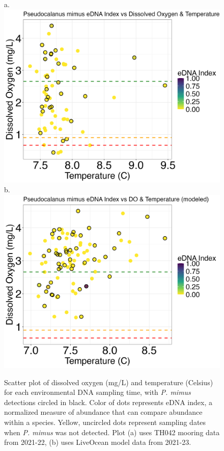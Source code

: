 \documentclass[12pt,twoside]{reedthesis}
\begin{document}
	\begin{figure}[!h]
		\begin{center}
			a. \includegraphics[scale=0.3]{Pmimus_Scatter_noOut}
			b. \includegraphics[scale=0.3]{Pmimus_Scatter_AllYr_mod_noOut}
			\caption[\textit{P. mimus} scatterplot]{\footnotesize{Scatter plot of dissolved oxygen (mg/L) and temperature (Celsius) for each environmental DNA sampling time, with \textit{P. mimus} detections circled in black. Color of dots represents eDNA index, a normalized measure of abundance that can compare abundance within a species. Yellow, uncircled dots represent sampling dates when \textit{P. mimus} was not detected. Plot (a) uses TH042 mooring data from 2021-22, (b) uses LiveOcean model data from 2021-23.}} %
		\end{center}
		\label{PmimusScatter}
	\end{figure} 
	
\end{document}
